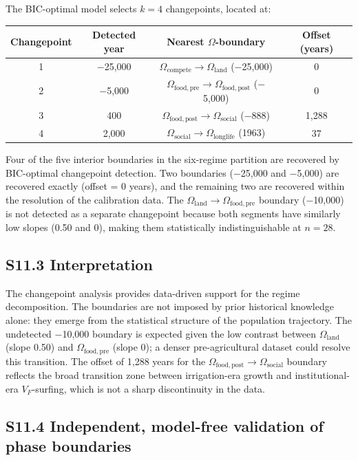 \documentclass[11pt]{article}
\begin{document}
The BIC-optimal model selects $k = 4$ changepoints, located at:

\begin{center}
\begin{tabular}{cccc}
\toprule
Changepoint & Detected year & Nearest $\Omega$-boundary & Offset (years) \\
\midrule
1 & $-$25,000 & $\Omega_{\mathrm{compete}} \to \Omega_{\mathrm{land}}$ ($-$25,000) & 0 \\
2 & $-$5,000 & $\Omega_{\mathrm{food,pre}} \to \Omega_{\mathrm{food,post}}$ ($-$5,000) & 0 \\
3 & 400 & $\Omega_{\mathrm{food,post}} \to \Omega_{\mathrm{social}}$ ($-$888) & 1,288 \\
4 & 2,000 & $\Omega_{\mathrm{social}} \to \Omega_{\mathrm{longlife}}$ (1963) & 37 \\
\bottomrule
\end{tabular}
\end{center}

Four of the five interior boundaries in the six-regime partition are recovered by BIC-optimal changepoint detection.
Two boundaries ($-$25,000 and $-$5,000) are recovered exactly (offset = 0 years), and the remaining two are recovered within the resolution of the calibration data.
The $\Omega_{\mathrm{land}} \to \Omega_{\mathrm{food,pre}}$ boundary ($-$10,000) is not detected as a separate changepoint because both segments have similarly low slopes (0.50 and 0), making them statistically indistinguishable at $n = 28$.

\subsection*{S11.3 Interpretation}

The changepoint analysis provides data-driven support for the regime decomposition.
The boundaries are not imposed by prior historical knowledge alone: they emerge from the statistical structure of the population trajectory.
The undetected $-$10,000 boundary is expected given the low contrast between $\Omega_{\mathrm{land}}$ (slope 0.50) and $\Omega_{\mathrm{food,pre}}$ (slope 0); a denser pre-agricultural dataset could resolve this transition.
The offset of 1,288 years for the $\Omega_{\mathrm{food,post}} \to \Omega_{\mathrm{social}}$ boundary reflects the broad transition zone between irrigation-era growth and institutional-era $V_F$-surfing, which is not a sharp discontinuity in the data.

\subsection*{S11.4 Independent, model-free validation of phase boundaries}\label{sec:S11_4_independent_boundaries}
\end{document}
